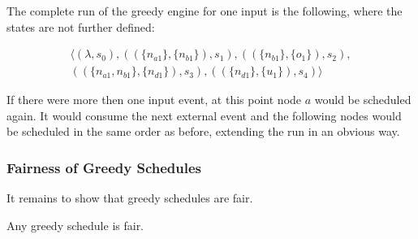 The complete run of the greedy engine for one input is the following, where the states are not further defined:

\begin{align*}
  \langle
    (\lambda,                             s_0),
    ((\{ n_{a1}         \}, \{n_{b1}\}),  s_1),
    ((\{ n_{b1}         \}, \{o_1\}),     s_2),\\
    ((\{ n_{a1}, n_{b1} \}, \{n_{d1}\}),  s_3),
    ((\{ n_{d1}         \}, \{u_1\}),     s_4)
  \rangle
\end{align*}

If there were more then one input event, at this point node \(a\) would be scheduled again.
It would consume the next external event and the following nodes would be scheduled in the same order as before, extending the run in an obvious way.

\subsubsection{Fairness of Greedy Schedules}
\label{sec:behaviours:without_timing:greedy:is_fair}

It remains to show that greedy schedules are fair.

\begin{lemma}[name = Greedy Schedules are Fair]\label{lemma:greedy_schedules_are_fair}
  Any greedy schedule is fair.
\end{lemma}

